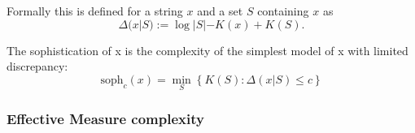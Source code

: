 Formally this is defined for a string $x$ and a set $S$ containing $x$ as
\begin{equation}
  \label{eq:6}
  \Delta(x|S) := \log |S| - K(x) + K(S).
\end{equation}

The sophistication of x is the complexity of
the simplest model of x with limited discrepancy:
\begin{equation}
  \label{eq:7}
  \text{soph}_{c}(x) = \min_{S}\left\{ K(S): \Delta(x|S) \leq c \right\}
\end{equation}

\parencite{koppelStructure1988, koppelAlmostMachineindependentTheory1991a,
  antunesSophisticationRevisited2009,
  motaSophisticationRandomnessDeficiency2013}

\subsubsection{Effective Measure complexity}

\parencite{grassbergerQuantitativeTheorySelfgenerated1986}
